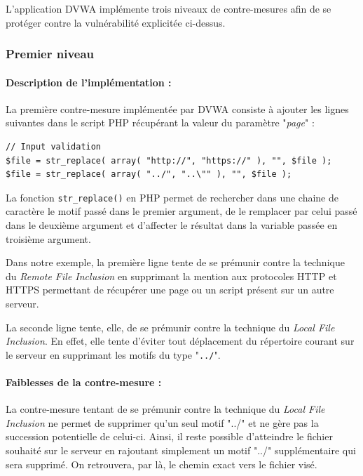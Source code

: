L'application DVWA implémente trois niveaux de contre-mesures afin de se protéger contre la vulnérabilité explicitée ci-dessus.

\subsubsection{Premier niveau}

\paragraph{Description de l'implémentation :}

La première contre-mesure implémentée par DVWA consiste à ajouter les lignes suivantes dans le script PHP récupérant la valeur du paramètre "\textit{page}" :

\begin{lstlisting}
// Input validation
$file = str_replace( array( "http://", "https://" ), "", $file );
$file = str_replace( array( "../", "..\"" ), "", $file ); 
\end{lstlisting}

La fonction \texttt{str\_replace()} en PHP permet de rechercher dans une chaine de caractère le motif passé dans le premier argument, de le remplacer par celui passé dans le deuxième argument et d'affecter le résultat dans la variable passée en troisième argument.

Dans notre exemple, la première ligne tente de se prémunir contre la technique du \textit{Remote File Inclusion} en supprimant la mention aux protocoles HTTP et HTTPS permettant de récupérer une page ou un script présent sur un autre serveur.

La seconde ligne tente, elle, de se prémunir contre la technique du \textit{Local File Inclusion}. En effet, elle tente d'éviter tout déplacement du répertoire courant sur le serveur en supprimant les motifs du type "\texttt{../}".

\paragraph{Faiblesses de la contre-mesure :}

La contre-mesure tentant de se prémunir contre la technique du \textit{Local File Inclusion} ne permet de supprimer qu'un seul motif "../" et ne gère pas la succession potentielle de celui-ci. Ainsi, il reste possible d'atteindre le fichier souhaité sur le serveur en rajoutant simplement un motif "../" supplémentaire qui sera supprimé. On retrouvera, par là, le chemin exact vers le fichier visé.

